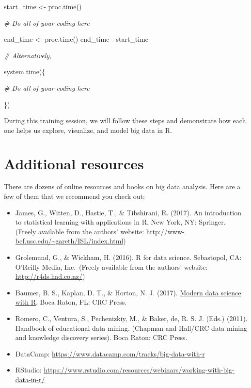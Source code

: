 \documentclass[
]{book}
\newenvironment{Shaded}{\begin{snugshade}}{\end{snugshade}}
\newcommand{\CommentTok}[1]{\textcolor[rgb]{0.56,0.35,0.01}{\textit{#1}}}
\newcommand{\FunctionTok}[1]{\textcolor[rgb]{0.00,0.00,0.00}{#1}}
\newcommand{\NormalTok}[1]{#1}
\newcommand{\OtherTok}[1]{\textcolor[rgb]{0.56,0.35,0.01}{#1}}
\newcommand{\SpecialCharTok}[1]{\textcolor[rgb]{0.00,0.00,0.00}{#1}}
\begin{document}
\begin{Shaded}
\begin{Highlighting}[]
\NormalTok{start\_time }\OtherTok{\textless{}{-}} \FunctionTok{proc.time}\NormalTok{()}

\CommentTok{\# Do all of your coding here}

\NormalTok{end\_time }\OtherTok{\textless{}{-}} \FunctionTok{proc.time}\NormalTok{()}
\NormalTok{end\_time }\SpecialCharTok{{-}}\NormalTok{ start\_time}

\CommentTok{\# Alternatively,}

\FunctionTok{system.time}\NormalTok{(\{}
  
 \CommentTok{\# Do all of your coding here }
  
\NormalTok{\})}
\end{Highlighting}
\end{Shaded}

During this training session, we will follow these steps and demonstrate how each one helps us explore, visualize, and model big data in R.

\hypertarget{additional-resources}{%
\section{Additional resources}\label{additional-resources}}

There are dozens of online resources and books on big data analysis. Here are a few of them that we recommend you check out:

\begin{itemize}
\item
  James, G., Witten, D., Hastie, T., \& Tibshirani, R. (2017). An introduction to statistical learning with applications in R. New York, NY: Springer. (Freely available from the authors' website: \url{http://www-bcf.usc.edu/~gareth/ISL/index.html})
\item
  Grolemund, G., \& Wickham, H. (2016). R for data science. Sebastopol, CA: O'Reilly Media, Inc.~(Freely available from the authors' website: \url{http://r4ds.had.co.nz/})
\item
  Baumer, B. S., Kaplan, D. T., \& Horton, N. J. (2017). \href{https://mdsr-book.github.io/}{Modern data science with R}. Boca Raton, FL: CRC Press.
\item
  Romero, C., Ventura, S., Pechenizkiy, M., \& Baker, de, R. S. J. (Eds.) (2011). Handbook of educational data mining. (Chapman and Hall/CRC data mining and knowledge discovery series). Boca Raton: CRC Press.
\item
  DataCamp: \url{https://www.datacamp.com/tracks/big-data-with-r}
\item
  RStudio: \url{https://www.rstudio.com/resources/webinars/working-with-big-data-in-r/}
\end{itemize}
\end{document}
